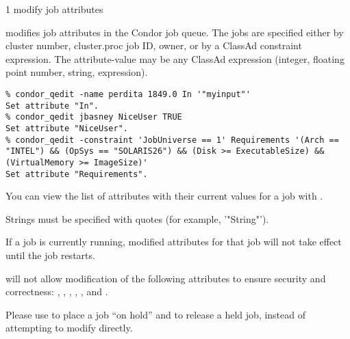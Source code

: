 \begin{ManPage}{\label{man-condor-qedit}}{1}
{modify job attributes}
\Synopsis {}
\Arg{\Dots}


\Description

 modifies job attributes in the Condor job queue.  The
jobs are specified either by cluster number, cluster.proc job ID,
owner, or by a ClassAd constraint expression.  The attribute-value may
be any ClassAd expression (integer, floating point number, string,
expression).

\begin{Options}
\end{Options}

\Examples
\begin{verbatim}
% condor_qedit -name perdita 1849.0 In '"myinput"'
Set attribute "In".
% condor_qedit jbasney NiceUser TRUE
Set attribute "NiceUser".
% condor_qedit -constraint 'JobUniverse == 1' Requirements '(Arch == "INTEL") && (OpSys == "SOLARIS26") && (Disk >= ExecutableSize) && (VirtualMemory >= ImageSize)'
Set attribute "Requirements".
\end{verbatim}

\GenRem
You can view the list of attributes with their current values for a
job with  .

Strings must be specified with quotes (for example, '"String"').

If a job is currently running, modified attributes for that job will
not take effect until the job restarts.

 will not allow modification of the following
attributes to ensure security and correctness: ,
, , , , and
.

Please use  to place a job ``on hold'' and
 to release a held job, instead of attempting to
modify  directly.

\end{ManPage}
